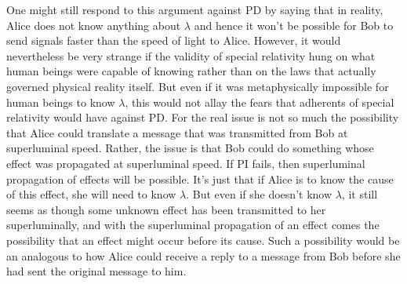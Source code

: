 One might still respond to this argument against PD by saying that in reality, Alice does not know anything about $\lambda$ and hence it won't be possible for Bob to send signals faster than the speed of light to Alice. However, it would nevertheless be very strange if the validity of special relativity hung on what human beings were capable of knowing rather than on the laws that actually governed physical reality itself. But even if it was metaphysically impossible for human beings to know $\lambda$, this would not allay the fears that adherents of special relativity would have against PD. For the real issue is not so much the possibility that Alice could translate a message that was transmitted from Bob at superluminal speed. Rather, the issue is that Bob could do something whose effect was propagated at superluminal speed. If PI fails, then superluminal propagation of effects will be possible.\label{lambdaknowledge} It's just that if Alice is to know the cause of this effect, she will need to know $\lambda$. But even if she doesn't know $\lambda$, it still seems as though some unknown effect has been transmitted to her superluminally, and with the superluminal propagation of an effect comes the possibility that an effect might occur before its cause. Such a possibility would be an analogous to how Alice could receive a reply to a message from Bob before she had sent the original message to him.